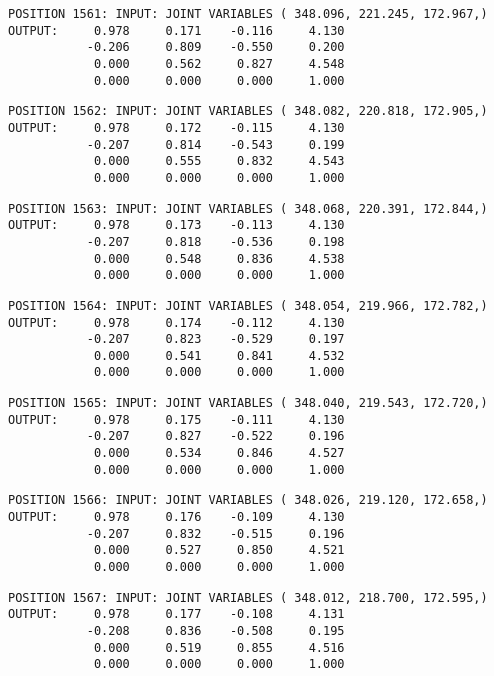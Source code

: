 \begin{verbatim}
POSITION 1561: INPUT: JOINT VARIABLES ( 348.096, 221.245, 172.967,)
OUTPUT:     0.978     0.171    -0.116     4.130
           -0.206     0.809    -0.550     0.200
            0.000     0.562     0.827     4.548
            0.000     0.000     0.000     1.000
\end{verbatim} \pagebreak[1]\begin{verbatim}
POSITION 1562: INPUT: JOINT VARIABLES ( 348.082, 220.818, 172.905,)
OUTPUT:     0.978     0.172    -0.115     4.130
           -0.207     0.814    -0.543     0.199
            0.000     0.555     0.832     4.543
            0.000     0.000     0.000     1.000
\end{verbatim} \pagebreak[1]\begin{verbatim}
POSITION 1563: INPUT: JOINT VARIABLES ( 348.068, 220.391, 172.844,)
OUTPUT:     0.978     0.173    -0.113     4.130
           -0.207     0.818    -0.536     0.198
            0.000     0.548     0.836     4.538
            0.000     0.000     0.000     1.000
\end{verbatim} \pagebreak[1]\begin{verbatim}
POSITION 1564: INPUT: JOINT VARIABLES ( 348.054, 219.966, 172.782,)
OUTPUT:     0.978     0.174    -0.112     4.130
           -0.207     0.823    -0.529     0.197
            0.000     0.541     0.841     4.532
            0.000     0.000     0.000     1.000
\end{verbatim} \pagebreak[1]\begin{verbatim}
POSITION 1565: INPUT: JOINT VARIABLES ( 348.040, 219.543, 172.720,)
OUTPUT:     0.978     0.175    -0.111     4.130
           -0.207     0.827    -0.522     0.196
            0.000     0.534     0.846     4.527
            0.000     0.000     0.000     1.000
\end{verbatim} \pagebreak[1]\begin{verbatim}
POSITION 1566: INPUT: JOINT VARIABLES ( 348.026, 219.120, 172.658,)
OUTPUT:     0.978     0.176    -0.109     4.130
           -0.207     0.832    -0.515     0.196
            0.000     0.527     0.850     4.521
            0.000     0.000     0.000     1.000
\end{verbatim} \pagebreak[1]\begin{verbatim}
POSITION 1567: INPUT: JOINT VARIABLES ( 348.012, 218.700, 172.595,)
OUTPUT:     0.978     0.177    -0.108     4.131
           -0.208     0.836    -0.508     0.195
            0.000     0.519     0.855     4.516
            0.000     0.000     0.000     1.000
\end{verbatim} \pagebreak[1]\begin{verbatim}

\end{verbatim}
